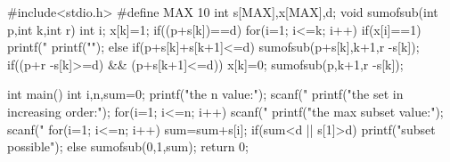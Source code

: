#include<stdio.h> 
#define MAX 10 
int s[MAX],x[MAX],d; 
void sumofsub(int p,int k,int r) 
{ 
    int i; 
    x[k]=1; 
    if((p+s[k])==d) 
    { 
        for(i=1; i<=k; i++) 
            if(x[i]==1) 
                printf("%
        printf("\n"); 
    } 
    else if(p+s[k]+s[k+1]<=d) 
        sumofsub(p+s[k],k+1,r 
                 -s[k]); 
    if((p+r 
            -s[k]>=d) && (p+s[k+1]<=d)) 
    { 
        x[k]=0; 
        sumofsub(p,k+1,r 
                 -s[k]); 
    } 
} 
 
 
int main() 
{ 
    int i,n,sum=0; 
    printf("\nEnter the n value:"); 
    scanf("%
    printf("\nEnter the set in increasing order:"); 
    for(i=1; i<=n; i++) 
        scanf("%
    printf("\nEnter the max subset value:"); 
    scanf("%
    for(i=1; i<=n; i++) 
        sum=sum+s[i]; 
    if(sum<d || s[1]>d) 
        printf("\nNo subset possible"); 
    else 
        sumofsub(0,1,sum); 
    return 0; 
}
